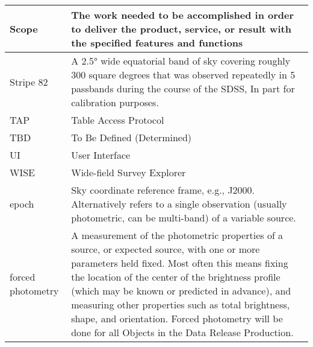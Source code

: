 \begin{longtable}{|p{}|p{}|}
Scope & The work needed to be accomplished in order to deliver the product, service, or result with the specified features and functions \\\hline
Stripe 82 & A 2.5° wide equatorial band of sky covering roughly 300 square degrees that was observed repeatedly in 5 passbands during the course of the SDSS, In part for calibration purposes. \\\hline
TAP & Table Access Protocol \\\hline
TBD & To Be Defined (Determined) \\\hline
UI & User Interface \\\hline
WISE & Wide-field Survey Explorer \\\hline
epoch & Sky coordinate reference frame, e.g., J2000. Alternatively refers to a single observation (usually photometric, can be multi-band) of a variable source. \\\hline
forced photometry & A measurement of the photometric properties of a source, or expected source, with one or more parameters held fixed. Most often this means fixing the location of the center of the brightness profile (which may be known or predicted in advance), and measuring other properties such as total brightness, shape, and orientation. Forced photometry will be done for all Objects in the Data Release Production. \\\hline
\end{longtable}
